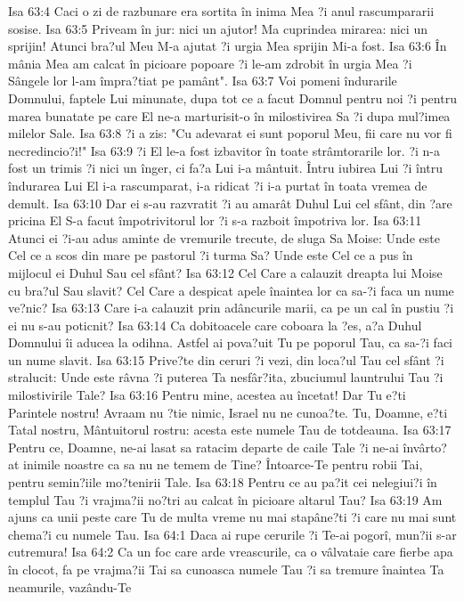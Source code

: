 Isa 63:4  Caci o zi de razbunare era sortita în inima Mea ?i anul rascumpararii sosise.
Isa 63:5  Priveam în jur: nici un ajutor! Ma cuprindea mirarea: nici un sprijin! Atunci bra?ul Meu M-a ajutat ?i urgia Mea sprijin Mi-a fost.
Isa 63:6  În mânia Mea am calcat în picioare popoare ?i le-am zdrobit în urgia Mea ?i Sângele lor l-am împra?tiat pe pamânt".
Isa 63:7  Voi pomeni îndurarile Domnului, faptele Lui minunate, dupa tot ce a facut Domnul pentru noi ?i pentru marea bunatate pe care El ne-a marturisit-o în milostivirea Sa ?i dupa mul?imea milelor Sale.
Isa 63:8  ?i a zis: "Cu adevarat ei sunt poporul Meu, fii care nu vor fi necredincio?i!"
Isa 63:9  ?i El le-a fost izbavitor în toate strâmtorarile lor. ?i n-a fost un trimis ?i nici un înger, ci fa?a Lui i-a mântuit. Întru iubirea Lui ?i întru îndurarea Lui El i-a rascumparat, i-a ridicat ?i i-a purtat în toata vremea de demult.
Isa 63:10  Dar ei s-au razvratit ?i au amarât Duhul Lui cel sfânt, din ?are pricina El S-a facut împotrivitorul lor ?i s-a razboit împotriva lor.
Isa 63:11  Atunci ei ?i-au adus aminte de vremurile trecute, de sluga Sa Moise: Unde este Cel ce a scos din mare pe pastorul ?i turma Sa? Unde este Cel ce a pus în mijlocul ei Duhul Sau cel sfânt?
Isa 63:12  Cel Care a calauzit dreapta lui Moise cu bra?ul Sau slavit? Cel Care a despicat apele înaintea lor ca sa-?i faca un nume ve?nic?
Isa 63:13  Care i-a calauzit prin adâncurile marii, ca pe un cal în pustiu ?i ei nu s-au poticnit?
Isa 63:14  Ca dobitoacele care coboara la ?es, a?a Duhul Domnului îi aducea la odihna. Astfel ai pova?uit Tu pe poporul Tau, ca sa-?i faci un nume slavit.
Isa 63:15  Prive?te din ceruri ?i vezi, din loca?ul Tau cel sfânt ?i stralucit: Unde este râvna ?i puterea Ta nesfâr?ita, zbuciumul launtrului Tau ?i milostivirile Tale?
Isa 63:16  Pentru mine, acestea au încetat! Dar Tu e?ti Parintele nostru! Avraam nu ?tie nimic, Israel nu ne cunoa?te. Tu, Doamne, e?ti Tatal nostru, Mântuitorul rostru: acesta este numele Tau de totdeauna.
Isa 63:17  Pentru ce, Doamne, ne-ai lasat sa ratacim departe de caile Tale ?i ne-ai învârto?at inimile noastre ca sa nu ne temem de Tine? Întoarce-Te pentru robii Tai, pentru semin?iile mo?tenirii Tale.
Isa 63:18  Pentru ce au pa?it cei nelegiui?i în templul Tau ?i vrajma?ii no?tri au calcat în picioare altarul Tau?
Isa 63:19  Am ajuns ca unii peste care Tu de multa vreme nu mai stapâne?ti ?i care nu mai sunt chema?i cu numele Tau.
Isa 64:1  Daca ai rupe cerurile ?i Te-ai pogorî, mun?ii s-ar cutremura!
Isa 64:2  Ca un foc care arde vreascurile, ca o vâlvataie care fierbe apa în clocot, fa pe vrajma?ii Tai sa cunoasca numele Tau ?i sa tremure înaintea Ta neamurile, vazându-Te
